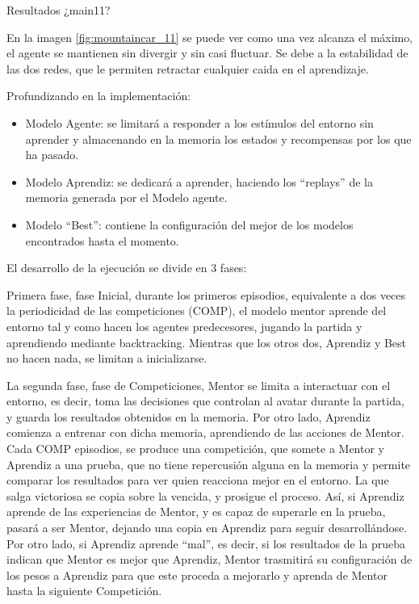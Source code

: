 %
       {Resultados ¿main11?}

En la imagen \ref{fig:mountaincar_11} se puede ver como una vez alcanza el máximo, el agente se mantienen sin divergir y sin casi fluctuar. Se debe a la estabilidad de las dos redes, que le permiten retractar cualquier caida en el aprendizaje.


Profundizando en la implementación:
\begin{itemize}
 \item Modelo Agente: se limitará a responder a los estímulos del entorno sin aprender y almacenando en la memoria los estados y recompensas por los que ha pasado.
 \item Modelo Aprendiz: se dedicará a aprender, haciendo los ``replays'' de la memoria generada por el Modelo agente.
 \item Modelo ``Best'': contiene la configuración del mejor de los modelos encontrados hasta el momento. 
\end{itemize}
El desarrollo de la ejecución se divide en 3 fases:

Primera fase, fase Inicial, durante los primeros episodios, equivalente a dos veces la periodicidad de las competiciones (COMP), el modelo mentor aprende del entorno tal y como hacen los agentes predecesores, jugando la partida y aprendiendo mediante backtracking. Mientras que los otros dos, Aprendiz y Best no hacen nada, se limitan a inicializarse.

La segunda fase, fase de Competiciones, Mentor se limita a interactuar con el entorno, es decir, toma las decisiones que controlan al avatar durante la partida, y guarda los resultados obtenidos en la memoria. Por otro lado, Aprendiz comienza a entrenar con dicha memoria, aprendiendo de las acciones de Mentor.
Cada COMP episodios, se produce una competición, que somete a Mentor y Aprendiz a una prueba, que no tiene repercusión alguna en la memoria y permite comparar los resultados para ver quien reacciona mejor en el entorno. La que salga victoriosa se copia sobre la vencida, y prosigue el proceso.
Así, si Aprendiz aprende de las experiencias de Mentor, y es capaz de superarle en la prueba, pasará a ser Mentor, dejando una copia en Aprendiz para seguir desarrollándose. Por otro lado, si Aprendiz aprende “mal”, es decir, si los resultados de la prueba indican que Mentor es mejor que Aprendiz, Mentor trasmitirá su configuración de los pesos a Aprendiz para que este proceda a mejorarlo y aprenda de Mentor hasta la siguiente Competición.  

